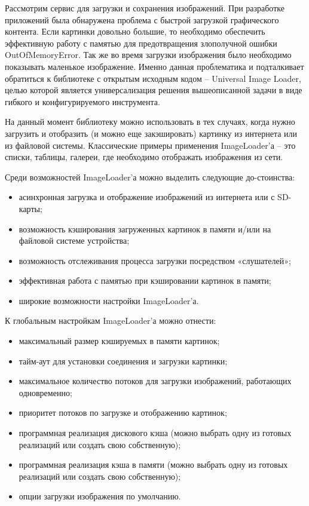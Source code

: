 Рассмотрим сервис для загрузки и сохранения изображений. При разработке приложений была обнаружена проблема с быстрой загрузкой графического контента. Если картинки довольно большие, то необходимо обеспечить эффективную работу с памятью для предотвращения злополучной ошибки OutOfMemoryError. Так же во время загрузки изображения было необходимо показывать маленькое изображение. Именно данная проблематика и подталкивает обратиться к библиотеке с открытым исходным кодом – Universal Image Loader, целью которой является универсализация решения вышеописанной задачи в виде гибкого и конфигурируемого инструмента.

На данный момент библиотеку можно использовать в тех случаях, когда нужно загрузить и отобразить (и можно еще закэшировать) картинку из интернета или из файловой системы. Классические примеры применения ImageLoader'а – это списки, таблицы, галереи, где необходимо отображать изображения из сети.

Среди возможностей ImageLoader'а можно выделить следующие до-стоинства:

\begin{itemize}
	\item асинхронная загрузка и отображение изображений из интернета или с SD-карты;
	\item возможность кэширования загруженных картинок в памяти и/или на файловой системе устройства;
	\item возможность отслеживания процесса загрузки посредством «слушателей»;
	\item эффективная работа с памятью при кэшировании картинок в памяти;
	\item широкие возможности настройки ImageLoader'а.
\end{itemize}

К глобальным настройкам ImageLoader'а можно отнести:

\begin{itemize}
	\item максимальный размер кэшируемых в памяти картинок;
	\item тайм-аут для установки соединения и загрузки картинки;
	\item максимальное количество потоков для загрузки изображений, работающих одновременно;
	\item приоритет потоков по загрузке и отображению картинок;
	\item программная реализация дискового кэша (можно выбрать одну из готовых реализаций или создать свою собственную);
	\item программная реализация кэша в памяти (можно выбрать одну из готовых реализаций или создать свою собственную);
	\item опции загрузки изображения по умолчанию.
\end{itemize}

